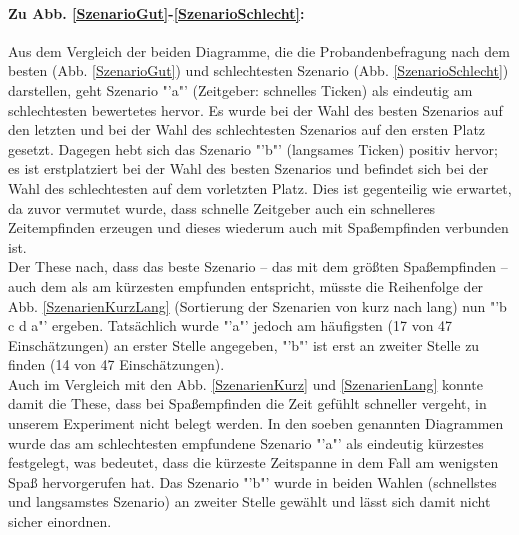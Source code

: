 \documentclass{Paper}
\begin{document}
\paragraph{Zu Abb. \ref{SzenarioGut}-\ref{SzenarioSchlecht}:} Aus dem Vergleich der beiden Diagramme, die die Probandenbefragung nach dem besten (Abb. \ref{SzenarioGut}) und schlechtesten Szenario (Abb. \ref{SzenarioSchlecht}) darstellen, geht Szenario "'a"' (Zeitgeber: schnelles Ticken) als eindeutig am schlechtesten bewertetes hervor. Es wurde bei der Wahl des besten Szenarios auf den letzten und bei der Wahl des schlechtesten Szenarios auf den ersten Platz gesetzt. Dagegen hebt sich das Szenario "'b"' (langsames Ticken) positiv hervor; es ist erstplatziert bei der Wahl des besten Szenarios und befindet sich bei der Wahl des schlechtesten auf dem vorletzten Platz. Dies ist gegenteilig wie erwartet, da zuvor vermutet wurde, dass schnelle Zeitgeber auch ein schnelleres Zeitempfinden erzeugen und dieses wiederum auch mit Spaßempfinden verbunden ist.\\
Der These nach, dass das beste Szenario -- das mit dem größten Spaßempfinden -- auch dem als am kürzesten empfunden entspricht, müsste die Reihenfolge der Abb. \ref{SzenarienKurzLang} (Sortierung der Szenarien von kurz nach lang) nun "'b c d a"' ergeben. Tatsächlich wurde "'a"' jedoch am häufigsten (17 von 47 Einschätzungen) an erster Stelle angegeben, "'b"' ist erst an zweiter Stelle zu finden (14 von 47 Einschätzungen).\\ 
Auch im Vergleich mit den Abb. \ref{SzenarienKurz} und \ref{SzenarienLang} konnte damit die These, dass bei Spaßempfinden die Zeit gefühlt schneller vergeht, in unserem Experiment nicht belegt werden. In den soeben genannten Diagrammen wurde das am schlechtesten empfundene Szenario "'a"' als eindeutig kürzestes festgelegt, was bedeutet, dass die kürzeste Zeitspanne in dem Fall am wenigsten Spaß hervorgerufen hat. Das Szenario "'b"' wurde in beiden Wahlen (schnellstes und langsamstes Szenario) an zweiter Stelle gewählt und lässt sich damit nicht sicher einordnen.\\




\end{document}
